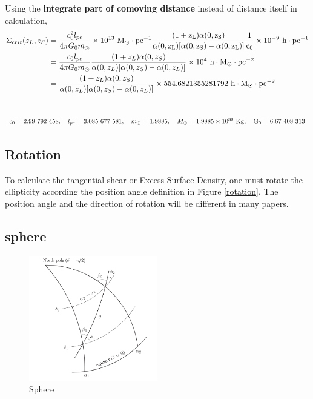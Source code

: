 \documentclass[12pt, a4paper]{article}
\begin{document}
Using the \textbf{integrate part of comoving distance} instead of distance itself in calculation,
\begin{align}
\Sigma_{crit}(z_L, z_S) &= \frac{c_0^2 l_{pc}}{4\pi G_0 m_{\odot}}\times 10^{13} \ \rm{M_{\odot} \cdot pc^{-1}} \frac{(1+z_L)\alpha(0,z_S)}{\alpha(0,z_L)[\alpha(0,z_S) - \alpha(0,z_L)]} \frac{1}{c_0} \times 10^{-9} \ \rm{h \cdot pc^{-1}} \nonumber \\
&=\frac{c_0 l_{pc}}{4\pi G_0 m_{\odot}}\frac{(1+z_L)\alpha(0,z_S)}{\alpha(0,z_L)[\alpha(0,z_S) - \alpha(0,z_L)]}\times 10^4 \ \rm{h \cdot M_{\odot}\cdot pc^{-2}} \nonumber\\
&=\frac{(1+z_L)\alpha(0,z_S)}{\alpha(0,z_L)[\alpha(0,z_S) - \alpha(0,z_L)]}\times 554.6821355281792 \ \rm{h \cdot M_{\odot} \cdot pc^{-2}}
\end{align}
\\

\begin{equation}
c_0 = 2.99\ 792\ 458; \quad  l_{pc} = 3.085\ 677\ 581; \quad m_{\odot} = 1.9885, \quad M_{\odot} = 1.9885\times 10^{30}\  \rm{Kg}; \quad G_0 = 6.67\ 408\ 313 \nonumber
\end{equation}


\subsection{Rotation}
To calculate the tangential shear or Excess Surface Density, one must rotate the ellipticity according the position angle definition in Figure \ref{rotation}. The position angle and the direction of rotation will be different in many papers.

\subsection{sphere}
\begin{figure}[h]
	\centering
	\includegraphics[width=0.5\textwidth]{sphere.PNG}
	\caption{Sphere}
	\label{sphere}
\end{figure}
\end{document}
